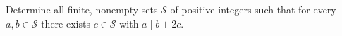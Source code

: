 Determine all finite, nonempty sets $\mathcal{S}$ of positive integers such that for every $a, b \in \mathcal{S}$ there exists $c \in \mathcal{S}$ with $a \mid b + 2c$.
